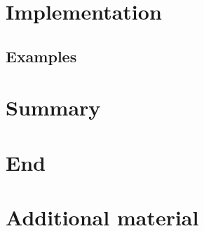 \documentclass[]{beamer}
\begin{document}
\section{Implementation}
\transition

\subsection{Examples}


\section{Summary}
\transition


\section*{End}
\thankyou


\appendix
{}


\beginbackup
\section{Additional material}
\transition
%
\backupend
\end{document}
